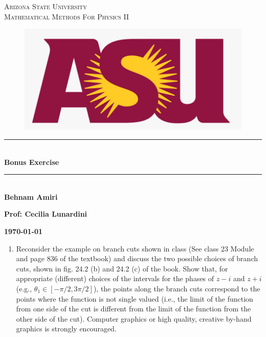 \documentclass[fleqn]{article}
\begin{document}
  \begin{titlepage}

    \newcommand{\HRule}{\rule{\linewidth}{0.5mm}}

    \center 


    \textsc{\LARGE Arizona State University}\\[1.5cm]

    \textsc{\LARGE Mathematical Methods For Physics II }\\[1.5cm]


    \begin{figure}
      \includegraphics[width=\linewidth]{asu.png}
    \end{figure}


    \HRule \\[0.4cm]
    { \huge \bfseries Bonus Exercise}\\[0.4cm] 
    \HRule \\[1.5cm]

    \textbf{Behnam Amiri}

    \bigbreak

    \textbf{Prof: Cecilia Lunardini}

    \bigbreak


    \textbf{{\large \today}\\[2cm]}

    \vfill

  \end{titlepage}

  \begin{enumerate}
    \item Reconsider the example on branch cuts shown in class 
    (See class 23 Module and page 836 of the textbook) and discuss the two possible choices of branch cuts, shown in fig. 
    24.2 (b) and 24.2 (c) of the book. Show that, for appropriate (different) choices of the intervals for the phases 
    of $z-i$ and $z+i$ (e.g., $\theta_1 \in [ -\pi/2 , 3 \pi/2]$), the points along the branch cuts correspond to the 
    points where the function is not single valued (i.e., the limit of the function from one side of the cut is different 
    from the limit of the function from the other side of the cut). Computer graphics or high quality, creative by-hand graphics is strongly encouraged. 
  \end{enumerate}
\end{document}

